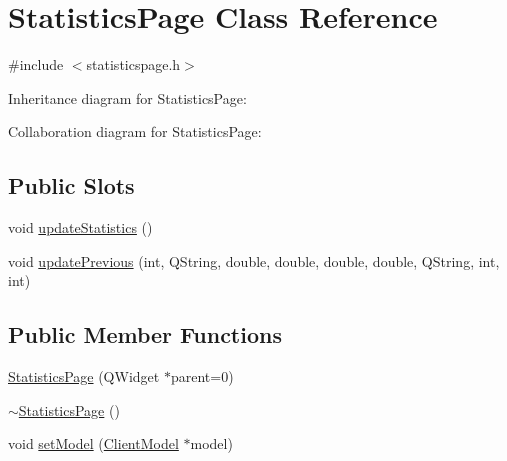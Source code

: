 \hypertarget{class_statistics_page}{}\section{Statistics\+Page Class Reference}
\label{class_statistics_page}


{\ttfamily \#include $<$statisticspage.\+h$>$}



Inheritance diagram for Statistics\+Page\+:


Collaboration diagram for Statistics\+Page\+:
\subsection*{Public Slots}
\begin{DoxyCompactItemize}
\item 
void \hyperlink{class_statistics_page_ae2defb5914f76600d9247b4d9c27258a}{update\+Statistics} ()
\item 
void \hyperlink{class_statistics_page_acdf111845b66dded9b0357aca90c845e}{update\+Previous} (int, Q\+String, double, double, double, double, Q\+String, int, int)
\end{DoxyCompactItemize}
\subsection*{Public Member Functions}
\begin{DoxyCompactItemize}
\item 
\hyperlink{class_statistics_page_ac0758358c37867a61ca65021db144b67}{Statistics\+Page} (Q\+Widget $\ast$parent=0)
\item 
\hyperlink{class_statistics_page_a0b725cc8e07f091f12688b02c00bc96a}{$\sim$\+Statistics\+Page} ()
\item 
void \hyperlink{class_statistics_page_a77a574b060d83075980926b74b2e5638}{set\+Model} (\hyperlink{class_client_model}{Client\+Model} $\ast$model)
\end{DoxyCompactItemize}

